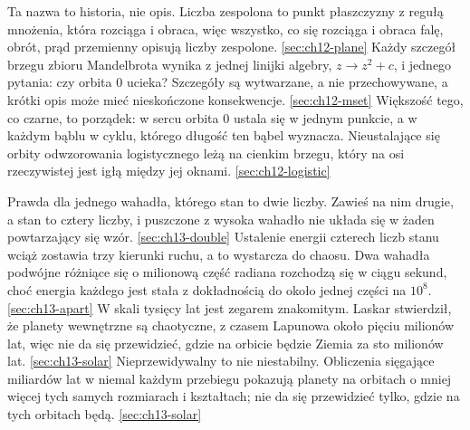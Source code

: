 %
  {Ta nazwa to historia, nie opis. Liczba zespolona to punkt płaszczyzny z regułą mnożenia, która rozciąga i obraca, więc wszystko, co się rozciąga i obraca \dash{} falę, obrót, prąd przemienny \dash{} opisują liczby zespolone.}%
  {\ref{sec:ch12-plane}}
%
  {Każdy szczegół brzegu zbioru Mandelbrota wynika z jednej linijki algebry, $z \to z^{2} + c$, i jednego pytania: czy orbita $0$ ucieka? Szczegóły są wytwarzane, a nie przechowywane, a krótki opis może mieć nieskończone konsekwencje.}%
  {\ref{sec:ch12-mset}}
%
  {Większość tego, co czarne, to porządek: w sercu orbita $0$ ustala się w jednym punkcie, a w każdym bąblu w cyklu, którego długość ten bąbel wyznacza. Nieustalające się orbity odwzorowania logistycznego leżą na cienkim brzegu, który na osi rzeczywistej jest igłą między jej oknami.}%
  {\ref{sec:ch12-logistic}}

%
  {Prawda dla jednego wahadła, którego stan to dwie liczby. Zawieś na nim drugie, a stan to cztery liczby, i puszczone z wysoka wahadło nie układa się w żaden powtarzający się wzór.}%
  {\ref{sec:ch13-double}}
%
  {Ustalenie energii czterech liczb stanu wciąż zostawia trzy kierunki ruchu, a to wystarcza do chaosu. Dwa wahadła podwójne różniące się o milionową część radiana rozchodzą się w ciągu sekund, choć energia każdego jest stała z dokładnością do około jednej części na $10^{8}$.}%
  {\ref{sec:ch13-apart}}
%
  {W skali tysięcy lat jest zegarem znakomitym. Laskar stwierdził, że planety wewnętrzne są chaotyczne, z czasem Lapunowa około pięciu milionów lat, więc nie da się przewidzieć, gdzie na orbicie będzie Ziemia za sto milionów lat.}%
  {\ref{sec:ch13-solar}}
%
  {Nieprzewidywalny to nie niestabilny. Obliczenia sięgające miliardów lat w niemal każdym przebiegu pokazują planety na orbitach o mniej więcej tych samych rozmiarach i kształtach; nie da się przewidzieć tylko, gdzie na tych orbitach będą.}%
  {\ref{sec:ch13-solar}}

